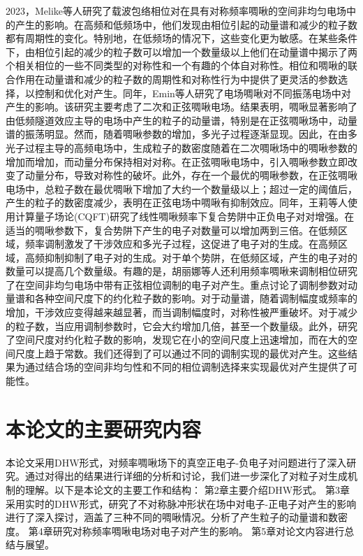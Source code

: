 2023，Melike等人研究了载波包络相位对在具有对称频率啁啾的空间非均匀电场中的产生的影响\cite{2023cMM}。在高频和低频场中，他们发现由相位引起的动量谱和减少的粒子数都有周期性的变化。特别地，在低频场的情况下，这些变化更为敏感。在某些条件下，由相位引起的减少的粒子数可以增加一个数量级以上他们在动量谱中揭示了两个相关相位的一些不同类型的对称性和一个有趣的个体自对称性。相位和啁啾的联合作用在动量谱和减少的粒子数的周期性和对称性行为中提供了更灵活的参数选择，以控制和优化对产生。同年，Emin等人研究了电场啁啾对不同振荡电场中对产生的影响\cite{2023ce}。该研究主要考虑了二次和正弦啁啾电场。结果表明，啁啾显著影响了由低频隧道效应主导的电场中产生的粒子的动量谱，特别是在正弦啁啾场中，动量谱的振荡明显。然而，随着啁啾参数的增加，多光子过程逐渐显现。因此，在由多光子过程主导的高频电场中，生成粒子的数密度随着在二次啁啾场中的啁啾参数的增加而增加，而动量分布保持相对对称。在正弦啁啾电场中，引入啁啾参数立即改变了动量分布，导致对称性的破坏。此外，存在一个最优的啁啾参数，在正弦啁啾电场中，总粒子数在最优啁啾下增加了大约一个数量级以上；超过一定的阈值后，产生的粒子的数密度减少，表明在正弦电场中啁啾有抑制效应。同年，王莉等人使用计算量子场论(CQFT)研究了线性啁啾频率下复合势阱中正负电子对对增强。在适当的啁啾参数下，复合势阱下产生的电子对数量可以增加两到三倍。在低频区域，频率调制激发了干涉效应和多光子过程，这促进了电子对的生成。在高频区域，高频抑制抑制了电子对的生成。对于单个势阱，在低频区域，产生的电子对的数量可以提高几个数量级。有趣的是，胡丽娜等人还利用频率啁啾来调制相位研究了在空间非均匀电场中带有正弦相位调制的电子对产生\cite{2023ch}。重点讨论了调制参数对动量谱和各种空间尺度下的约化粒子数的影响。对于动量谱，随着调制幅度或频率的增加，干涉效应变得越来越显著，而当调制幅度时，对称性被严重破坏。对于减少的粒子数，当应用调制参数时，它会大约增加几倍，甚至一个数量级。此外，研究了空间尺度对约化粒子数的影响，发现它在小的空间尺度上迅速增加，而在大的空间尺度上趋于常数。我们还得到了可以通过不同的调制实现的最优对产生。这些结果为通过结合场的空间非均匀性和不同的相位调制选择来实现最优对产生提供了可能性。

\section{本论文的主要研究内容}
本论文采用DHW形式，对频率啁啾场下的真空正电子-负电子对问题进行了深入研究。通过对得出的结果进行详细的分析和讨论，我们进一步深化了对粒子对生成机制的理解。以下是本论文的主要工作和结构：
第2章主要介绍DHW形式。
第3章采用实时的DHW形式，研究了不对称脉冲形状在场中对电子-正电子对产生的影响进行了深入探讨，涵盖了三种不同的啁啾情况。分析了产生粒子的动量谱和数密度。
第4章研究对称频率啁啾电场对电子对产生的影响。
第5章对论文内容进行总结与展望。





